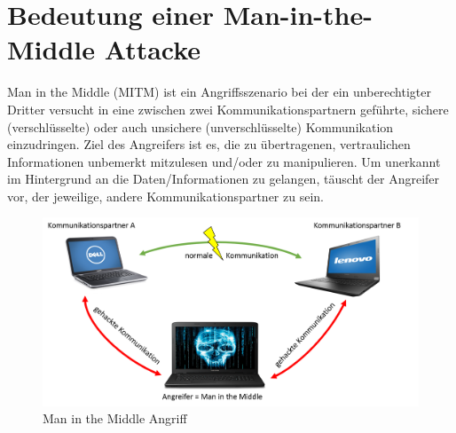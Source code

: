 \section{Bedeutung einer Man-in-the-Middle Attacke}
Man in the Middle (MITM) ist ein Angriffsszenario bei der ein unberechtigter Dritter versucht in eine zwischen zwei Kommunikationspartnern geführte, sichere (verschlüsselte) oder auch unsichere (unverschlüsselte) Kommunikation einzudringen. Ziel des Angreifers ist es, die zu übertragenen, vertraulichen Informationen unbemerkt mitzulesen und/oder zu manipulieren. Um unerkannt im Hintergrund an die Daten/Informationen zu gelangen, täuscht der Angreifer vor, der jeweilige, andere Kommunikationspartner zu sein.
\begin{figure}[H]
	\centering
	\includegraphics[width=1\linewidth]{images/MITM.png}
	\caption{Man in the Middle Angriff}
\end{figure}
